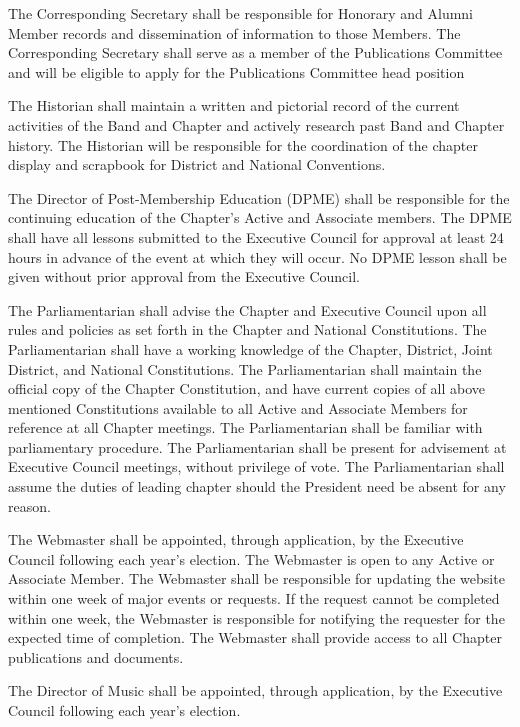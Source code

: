 \documentclass[11pt]{article}
\begin{document}
\begin{legal}
    The Corresponding Secretary shall be responsible for Honorary and Alumni Member records and dissemination of information to those Members.
    The Corresponding Secretary shall serve as a member of the Publications Committee and will be eligible to apply for the Publications Committee head position
  \item
    The Historian shall maintain a written and pictorial record of the current activities of the Band and Chapter and actively research past Band and Chapter history.
    The Historian will be responsible for the coordination of the chapter display and scrapbook for District and National Conventions.
  \item
    The Director of Post-Membership Education (DPME) shall be responsible for the continuing education of the Chapter’s Active and Associate members.
    The DPME shall have all lessons submitted to the Executive Council for approval at least 24 hours in advance of the event at which they will occur.
    No DPME lesson shall be given without prior approval from the Executive Council.
  \item
    The Parliamentarian shall advise the Chapter and Executive Council upon all rules and policies as set forth in the Chapter and National Constitutions.
    The Parliamentarian shall have a working knowledge of the Chapter, District, Joint District, and National Constitutions.
    The Parliamentarian shall maintain the official copy of the Chapter Constitution, and have current copies of all above mentioned Constitutions available to all Active and Associate Members for reference at all Chapter meetings.
    The Parliamentarian shall be familiar with parliamentary procedure.
    The Parliamentarian shall be present for advisement at Executive Council meetings, without privilege of vote.
    The Parliamentarian shall assume the duties of leading chapter should the President need be absent for any reason. 
  \item
    The Webmaster shall be appointed, through application, by the Executive Council following each year’s election.
    The Webmaster is open to any Active or Associate Member.
    The Webmaster shall be responsible for updating the website within one week of major events or requests.
    If the request cannot be completed within one week, the Webmaster is responsible for notifying the requester for the expected time of completion.
    The Webmaster shall provide access to all Chapter publications and documents.
  \item
    The Director of Music shall be appointed, through application, by the Executive Council following each year’s election.

\end{legal}
\end{document}
